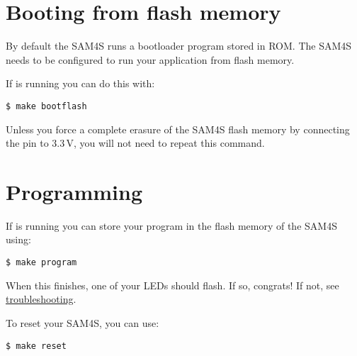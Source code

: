 \section{Booting from flash memory}
\label{booting-from-flash-memory}

By default the SAM4S runs a bootloader program stored in ROM. The SAM4S
needs to be configured to run your application from flash memory.

If  is running you can do this with:

\begin{verbatim}
$ make bootflash
\end{verbatim}

Unless you force a complete erasure of the SAM4S flash memory by
connecting the  pin to 3.3\,V, you will not need to repeat
this command.

\section{Programming}
\label{programming}

If  is running you can store your program in the flash
memory of the SAM4S using:

\begin{verbatim}
$ make program
\end{verbatim}

When this finishes, one of your LEDs should flash. If so, congrats! If
not, see \protect\hyperref[troubleshooting]{troubleshooting}.

To reset your SAM4S, you can use:
%
\begin{verbatim}
$ make reset
\end{verbatim}

